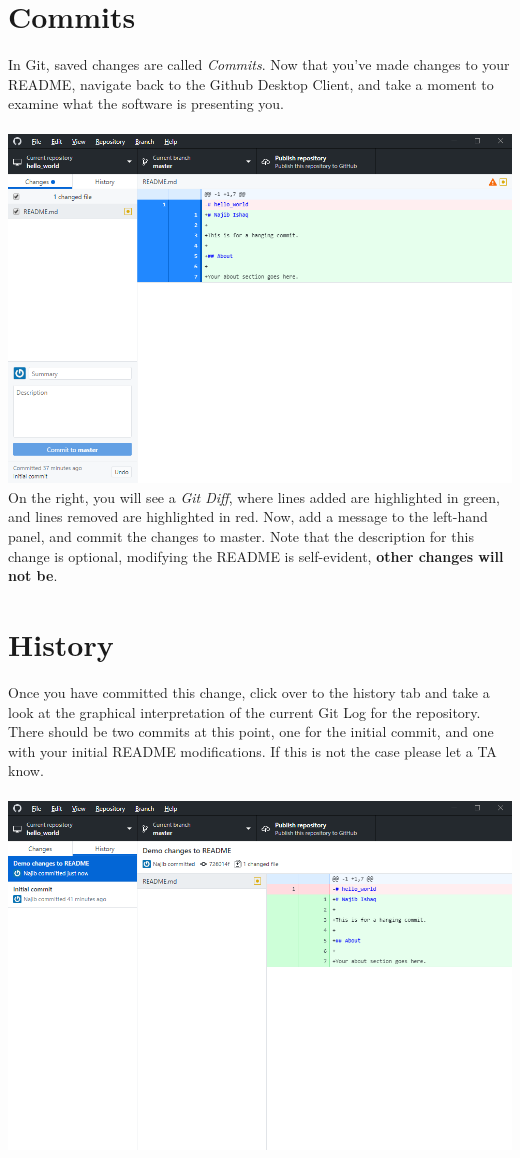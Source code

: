 \documentclass[12pt, letter]{article}
\begin{document}
    \section{Commits}
    In Git, saved changes are called \emph{Commits}. Now that you've made changes to your README, navigate back to the Github Desktop Client, and take a moment to examine what the software is presenting you. \\ \\ %
    \includegraphics{screenshots/shot4.bmp}
    \\
    On the right, you will see a \emph{Git Diff}, where lines added are highlighted in green, and lines removed are highlighted in red. Now, add a message to the left-hand panel, and commit the changes to master. Note that the description for this change is optional, modifying the README is self-evident, \textbf{other changes will not be}.

    \section{History}
    Once you have committed this change, click over to the history tab and take a look at the graphical interpretation of the current Git Log for the repository. There should be two commits at this point, one for the initial commit, and one with your initial README modifications. If this is not the case please let a TA know. \\ \\ %
    \includegraphics{screenshots/shot5.bmp}
\end{document}
